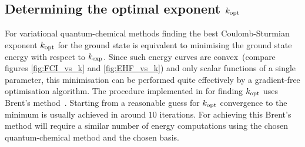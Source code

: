 %


%
%


%
%
\subsection{Determining the optimal exponent $k_\text{opt}$}
\label{sec:DetermineKopt}
For variational quantum-chemical methods finding the best Coulomb-Sturmian
exponent $k_\text{opt}$ for the ground state is equivalent to minimising the ground state
energy with respect to $k_\text{exp}$.
Since such energy curves are
convex~(compare figures \ref{fig:FCI_vs_k} and \ref{fig:EHF_vs_k})
and only scalar functions of a single parameter,
this minimisation can be performed quite effectively
by a gradient-free optimisation algorithm.
The procedure implemented in \molsturm for finding $k_\text{opt}$
uses Brent's method~\cite{Brent1972}.
Starting from a reasonable guess for $k_\text{opt}$ convergence to the minimum
is usually achieved in around $10$ iterations.
For achieving this Brent's method will require a similar number of
energy computations using the chosen quantum-chemical method
and the chosen \CS basis.

